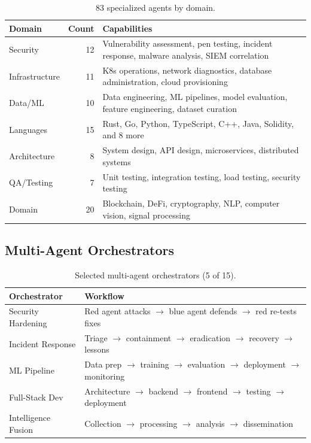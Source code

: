 \documentclass[11pt,letterpaper]{article}
\begin{document}
\begin{table}[H]
\centering
\small
\begin{tabular}{@{}lrp{5.5cm}@{}}
\toprule
\textbf{Domain} & \textbf{Count} & \textbf{Capabilities} \\
\midrule
Security & 12 & Vulnerability assessment, pen testing, incident response, malware analysis, SIEM correlation \\
Infrastructure & 11 & K8s operations, network diagnostics, database administration, cloud provisioning \\
Data/ML & 10 & Data engineering, ML pipelines, model evaluation, feature engineering, dataset curation \\
Languages & 15 & Rust, Go, Python, TypeScript, C++, Java, Solidity, and 8 more \\
Architecture & 8 & System design, API design, microservices, distributed systems \\
QA/Testing & 7 & Unit testing, integration testing, load testing, security testing \\
Domain & 20 & Blockchain, DeFi, cryptography, NLP, computer vision, signal processing \\
\bottomrule
\end{tabular}
\caption{83 specialized agents by domain.}
\label{tab:agent-taxonomy}
\end{table}

\subsection{Multi-Agent Orchestrators}

\begin{table}[H]
\centering
\small
\begin{tabular}{@{}lp{6cm}@{}}
\toprule
\textbf{Orchestrator} & \textbf{Workflow} \\
\midrule
Security Hardening & Red agent attacks $\to$ blue agent defends $\to$ red re-tests fixes \\
Incident Response & Triage $\to$ containment $\to$ eradication $\to$ recovery $\to$ lessons \\
ML Pipeline & Data prep $\to$ training $\to$ evaluation $\to$ deployment $\to$ monitoring \\
Full-Stack Dev & Architecture $\to$ backend $\to$ frontend $\to$ testing $\to$ deployment \\
Intelligence Fusion & Collection $\to$ processing $\to$ analysis $\to$ dissemination \\
\bottomrule
\end{tabular}
\caption{Selected multi-agent orchestrators (5 of 15).}
\label{tab:orchestrators}
\end{table}
\end{document}
